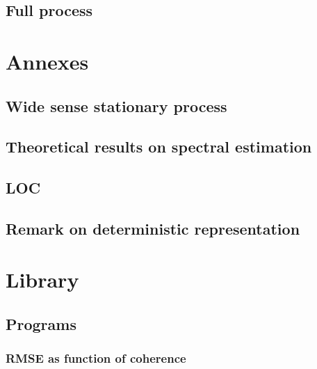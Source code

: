 \documentclass[a4paper, 12pt]{report}
\begin{document}
\chapter{Full process}
\label{chap:fullprocess}


\part{Annexes}
\chapter{Wide sense stationary process}
\label{ann:wss}

\chapter{Theoretical results on spectral estimation}
\label{ann:spectral-estimation}
 
\chapter{LOC}
 
\chapter{Remark on deterministic representation}
 

\part{Library}
 \def\programs{../../allprogs/}
 \def\programsfullprocess{fullprocess/}
 \def\programsToolbox{fullprocess/ZZtoolbox/}
 \def\programspierrick{fullprocess/ZZtoolbox/00Pierrick/}
\chapter{Programs}
 \section{RMSE as function of coherence}
{\tiny }
\end{document}
